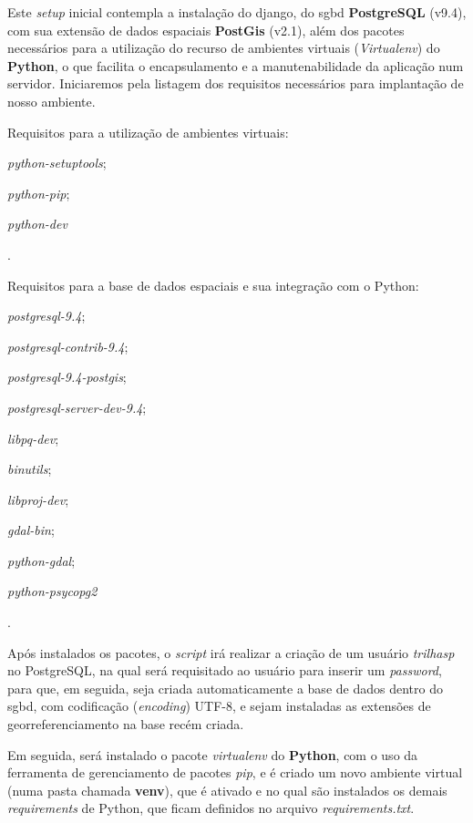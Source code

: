 Este \textit{setup} inicial contempla a instalação do \gls{django}, do \gls{sgbd} \textbf{PostgreSQL} (v9.4), com sua extensão de dados espaciais \textbf{PostGis} (v2.1), além dos pacotes necessários para a utilização do recurso de ambientes virtuais (\textit{Virtualenv}) do \textbf{Python}, o que facilita o encapsulamento e a manutenabilidade da aplicação num servidor. Iniciaremos pela listagem dos requisitos necessários para implantação de nosso ambiente.

Requisitos para a utilização de ambientes virtuais: %
\begin{enumerate*}[label=\itshape\alph*\upshape)] 
    \item \mbox{\textit{python-setuptools}};
    \item \mbox{\textit{python-pip}};
    \item \mbox{\textit{python-dev}}
\end{enumerate*}.

Requisitos para a base de dados espaciais e sua integração com o Python: %
\begin{enumerate*}[label=\itshape\alph*\upshape)]
    \item\mbox{\textit{postgresql-9.4}};
    \item\mbox{\textit{postgresql-contrib-9.4}};
    \item\mbox{\textit{postgresql-9.4-postgis}};
    \item\mbox{\textit{postgresql-server-dev-9.4}};
    \item\mbox{\textit{libpq-dev}};
    \item\mbox{\textit{binutils}};
    \item\mbox{\textit{libproj-dev}};
    \item\mbox{\textit{gdal-bin}};
    \item\mbox{\textit{python-gdal}};
    \item\mbox{\textit{python-psycopg2}}
\end{enumerate*}.

Após instalados os pacotes, o \textit{script} irá realizar a criação de um usuário \textit{trilhasp} no PostgreSQL, na qual será requisitado ao usuário para inserir um \textit{password}, para que, em seguida, seja criada automaticamente a base de dados dentro do \gls{sgbd}, com codificação (\textit{encoding}) UTF-8, e sejam instaladas as extensões de georreferenciamento na base recém criada.

Em seguida, será instalado o pacote \textit{virtualenv} do \textbf{Python}, com o uso da ferramenta de gerenciamento de pacotes \textit{pip}, e é criado um novo ambiente virtual (numa pasta chamada \textbf{venv}), que é ativado e no qual são instalados os demais \textit{requirements} de Python, que ficam definidos no arquivo \textit{requirements.txt}.

